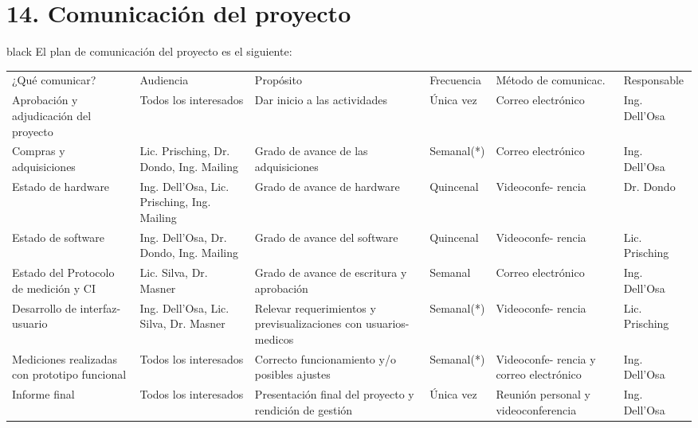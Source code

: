 \documentclass[11pt]{charter}
\begin{document}
\section{14. Comunicación del proyecto}
\label{sec:comunicaciones}

\begin{consigna}{black}
El plan de comunicación del proyecto es el siguiente:
\end{consigna}

\begin{table}[H]
\centering
\begin{tabularx}{\linewidth}{@{}|X|X|X|X|X|X|@{}}
\hline
\rowcolor[HTML]{C0C0C0} 
\multicolumn{6}{|c|}{\cellcolor[HTML]{C0C0C0}PLAN DE COMUNICACIÓN DEL PROYECTO}                                                                       \\ \hline
\rowcolor[HTML]{C0C0C0} 
¿Qué comunicar? & Audiencia & Propósito & Frecuencia & Método de comunicac. & Responsable \\ \hline
Aprobación y adjudicación del proyecto & Todos los interesados & Dar inicio a las actividades & Única vez & Correo electrónico & Ing. Dell'Osa \\ \hline
Compras y adquisiciones & Lic. Prisching, Dr. Dondo, Ing. Mailing  & Grado de avance de las adquisiciones & Semanal(*)  & Correo electrónico & Ing. Dell'Osa \\ \hline
Estado de hardware & Ing. Dell'Osa, Lic. Prisching, Ing. Mailing & Grado de avance de hardware & Quincenal & Videoconfe- rencia & Dr. Dondo \\ \hline
Estado de software & Ing. Dell'Osa, Dr. Dondo, Ing. Mailing & Grado de avance del software & Quincenal & Videoconfe- rencia & Lic. Prisching \\ \hline
Estado del Protocolo de medición y CI & Lic. Silva, Dr. Masner & Grado de avance de escritura y aprobación & Semanal & Correo electrónico & Ing. Dell'Osa \\ \hline
Desarrollo de interfaz-usuario & Ing. Dell'Osa, Lic. Silva, Dr. Masner & Relevar requerimientos y previsualizaciones con usuarios-medicos & Semanal(*) & Videoconfe- rencia & Lic. Prisching            \\ \hline
Mediciones realizadas con prototipo funcional & Todos los interesados & Correcto funcionamiento y/o posibles ajustes  & Semanal(*) & Videoconfe- rencia y correo electrónico & Ing. Dell'Osa\\ \hline
Informe final & Todos los interesados & Presentación final del proyecto y rendición de gestión & Única vez & Reunión personal y videoconferencia & Ing. Dell'Osa \\ \hline
\end{tabularx}%
\end{table}
\end{document}
